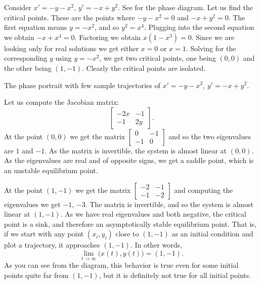 \begin{example} \label{example:nlin-xplusy}
Consider
$x'=-y-x^2$,
$y'=-x+y^2$.
See  for the phase diagram.
Let us find the critical points.  These are the points where
$-y-x^2 = 0$ and $-x+y^2=0$.  The first equation means $y = -x^2$, and
so $y^2 = x^4$.  Plugging into the second equation we obtain 
$-x+x^4 = 0$.  Factoring we obtain $x(1-x^3)=0$.  Since we are looking only
for real solutions we get either $x=0$ or $x=1$.  Solving for the
corresponding $y$ using $y = -x^2$, we get two critical points, one being $(0,0)$
and the other being $(1,-1)$.  Clearly the critical points are isolated.

\begin{myfig}
\capstart
{}
\caption{The phase portrait with few sample trajectories of 
$x'=-y-x^2$, $y'=-x+y^2$.  \label{fig:nlin-ex813-new}}
\end{myfig}


Let us compute the Jacobian matrix:
\begin{equation*}
\begin{bmatrix}
-2x & -1 \\
-1 & 2y
\end{bmatrix} .
\end{equation*}
At the point $(0,0)$ we get the matrix
$\left[ \begin{smallmatrix} 0 & -1 \\ -1 & 0 \end{smallmatrix} \right]$ and
so the two eigenvalues are $1$ and $-1$.  As the matrix is invertible, the system is almost linear
at $(0,0)$.  As the eigenvalues are real
and of opposite signs, we get a saddle point, which is an unstable
equilibrium point.

At the point $(1,-1)$ we get the matrix
$\left[ \begin{smallmatrix} -2 & -1 \\ -1 & -2 \end{smallmatrix} \right]$ and
computing the eigenvalues we get $-1$, $-3$.
The matrix is invertible, and so the system is almost linear at $(1,-1)$.
As we have real eigenvalues and both negative, the critical
point is a sink, and therefore an asymptotically stable equilibrium point.
That is, if we start with any point $(x_i,y_i)$ close to $(1,-1)$ as
an initial condition and plot a trajectory, it approaches $(1,-1)$.
In other words,
\begin{equation*}
\lim_{t \to \infty} \bigl( x(t), y(t) \bigr) = (1,-1) .
\end{equation*}
As you can 
see from the diagram, this behavior is true even for some
initial points quite far from $(1,-1)$, but it is definitely not true for all
initial points.
\end{example}

